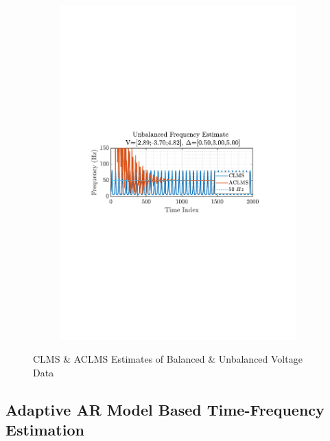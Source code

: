 \documentclass[12pt]{article}
\begin{document}
\begin{figure}[H]
\begin{subfigure}{0.49\textwidth}
					\includegraphics[trim={2.2cm 11.2cm 3.00cm  11.2cm}, clip, width=\textwidth]{../MATLAB/figures/q3_1e_fig04.pdf} 
					\captionsetup{justification=centering}
				\end{subfigure}
				
				\captionsetup{justification=centering}
				\caption{CLMS \& ACLMS Estimates of Balanced \& Unbalanced Voltage Data}
				\label{fig: 3-1e}
			\end{figure}
	\subsection{Adaptive AR Model Based Time-Frequency Estimation} \label{sec: 3-2-adaptive-ar-spectrum-estimate}
\end{document}
